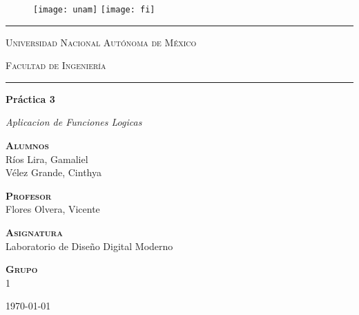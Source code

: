 \documentclass[../main.tex]{subfiles}
\begin{document}
\begin{titlepage}
  \begin{figure}[ht]
    \texttt{[image: unam]}
    \label{EscudoUNAM}
    \endminipage
    \texttt{[image: fi]}
    \label{EscudoFI}
    \endminipage
  \end{figure}

  \begin{center}
    \hrule height 0.5mm
    \vspace{0.2cm}
    \LARGE
    \textsc{Universidad Nacional Autónoma de México}

    \vfill
    \LARGE
    \textsc{Facultad de Ingeniería}
    \vspace{0.4cm}
    \hrule height 0.5mm

    \vfill
    \LARGE
    \textbf{Práctica 3}\\
    \vspace{0.8cm}
    \begin{minipage}{15cm}
      \centering
      \Large
      \textit{Aplicacion de Funciones Logicas}
    \end{minipage}

    \vfill
    \large
    {\scshape \bfseries Alumnos}\\
    \vspace{.3cm}
    \large
    Ríos Lira, Gamaliel \\ Vélez Grande, Cinthya

    \vfill
    \large
    {\scshape \bfseries Profesor}\\
    \vspace{.3cm}
    \large
    Flores Olvera, Vicente

    \vfill
    \large
    {\scshape \bfseries Asignatura}\\
    \vspace{.3cm}
    \large
    Laboratorio de Diseño Digital Moderno

    \vfill
    \large
    {\scshape \bfseries Grupo}\\
    \vspace{.3cm}
    \large
    1

    \vfill
    \today
  \end{center}
\end{titlepage}
\end{document}
